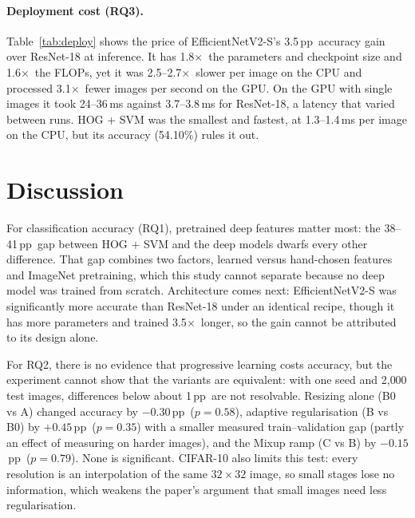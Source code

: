 \documentclass{COMPXXXX}
\newcommand{\pp}{\,pp}
\newcommand{\sx}{$\times$}
\begin{document}
\paragraph{Deployment cost (RQ3).} Table~\ref{tab:deploy} shows the price of EfficientNetV2-S's
3.5\pp\ accuracy gain over ResNet-18 at inference. It has 1.8\sx\ the parameters and checkpoint size and
1.6\sx\ the FLOPs, yet it was 2.5--2.7\sx\ slower per image on the CPU and processed 3.1\sx\ fewer images per
second on the GPU. On the GPU with single images it took 24--36\,ms against 3.7--3.8\,ms for ResNet-18,
a latency that varied between runs. HOG + SVM was the smallest and fastest, at 1.3--1.4\,ms per image
on the CPU, but its accuracy (54.10\%) rules it out.

\section{Discussion}
For classification accuracy (RQ1), pretrained deep features matter most: the 38--41\pp\ gap between
HOG + SVM and the deep models dwarfs every other difference. That gap combines two factors, learned
versus hand-chosen features and ImageNet pretraining, which this study cannot separate because no deep
model was trained from scratch. Architecture comes next: EfficientNetV2-S was
significantly more accurate than ResNet-18 under an identical recipe, though it has more parameters and
trained 3.5\sx\ longer, so the gain cannot be attributed to its design alone.

For RQ2, there is no evidence that progressive learning costs accuracy, but the experiment cannot show
that the variants are equivalent: with one seed and 2{,}000 test images, differences below about 1\pp\
are not resolvable. Resizing alone (B0 vs A) changed accuracy by $-0.30$\pp\ ($p=0.58$), adaptive
regularisation (B vs B0) by $+0.45$\pp\ ($p=0.35$) with a smaller measured train--validation gap
(partly an effect of measuring on harder images), and the
Mixup ramp (C vs B) by $-0.15$\pp\ ($p=0.79$). None is significant. CIFAR-10 also limits this test:
every resolution is an interpolation of the same $32{\times}32$ image, so small stages lose no
information, which weakens the paper's argument that small images need less regularisation.
\end{document}
